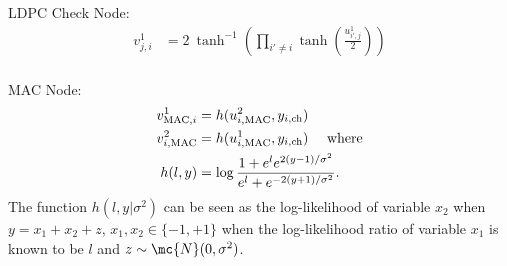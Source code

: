 \documentclass[final,onecolumn,12pt]{IEEEtran}
\begin{document}
LDPC Check Node:
\begin{align*}
v^{1}_{j,i}&=2~\tanh^{-1}\left( \prod_{i'\neq i} \tanh\left(\frac{u^{1}_{i',j}}{2}\right)\right)\\
\end{align*}

MAC Node:
\begin{align}
\label{Eqn:MACnodeBP}
v^{1}_{\text{MAC},i}&=h(u^{2}_{i,\text{MAC}},y_{i,\text{ch}})\\
v^{2}_{i,\text{MAC}}&=h(u^{1}_{i,\text{MAC}},y_{i,\text{ch}}) ~~~\text{ where}\notag\\
h(l,y)&=\log \frac{1+e^{l}e^{2(y-1)/\sigma^2}}{e^{l}+e^{-2(y+1)/\sigma^2}}.\notag
\end{align}
The function $h(l,y|\sigma^2)$ can be seen as the log-likelihood of variable $x_2$ when $y=x_1+x_2+z$, $x_1,x_2\in\{-1,+1\}$ when the log-likelihood ratio of variable $x_1$ is known to be $l$ and $z\sim \mc{N}(0,\sigma^2)$.
\end{document}
